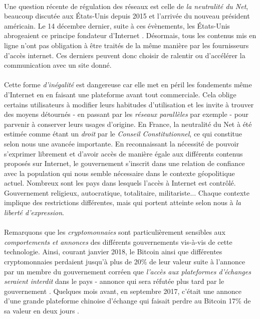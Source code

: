 \paragraph{} Une question récente de régulation des réseaux est celle de \emph{la neutralité du Net},
beaucoup discutée aux États-Unis depuis 2015 et l'arrivée du nouveau président américain. Le 14 décembre
dernier, suite à ces évènements, les États-Unis abrogeaient ce principe fondateur d'Internet \cite{NetNeutrality0}.
Désormais, tous les contenus mis en ligne n'ont pas obligation à être traités de la même manière par
les fournisseurs d'accès internet. Ces derniers peuvent donc choisir de ralentir ou d'accélérer la communication
avec un site donné.

\paragraph{} Cette forme \emph{d'inégalité} est dangereuse car elle met en péril les fondements même d'Internet
en en faisant une plateforme avant tout commerciale. Cela oblige certains utilisateurs à modifier leurs habitudes 
d'utilisation et les invite à trouver des moyens détournés - en passant par les \emph{réseaux parallèles} par exemple -
pour parvenir à conserver leurs usages d'origine. En France, la neutralité du Net à été estimée comme étant un \emph{droit} 
par le \emph{Conseil Constitutionnel}, ce qui constitue selon nous une avancée importante. En reconnaissant la
nécessité de pouvoir s'exprimer librement et d'avoir accès de manière égale aux différents contenus proposés
sur Internet, le gouvernement s'inscrit dans une relation de confiance avec la population qui nous semble
nécessaire dans le contexte géopolitique actuel. Nombreux sont les pays dans lesquels l'accès à Internet
est contrôlé. Gouvernement religieux, autocratique, totalitaire, militariste... Chaque contexte implique
des restrictions différentes, mais qui portent atteinte selon nous à \emph{la liberté d'expression}.

\paragraph{} Remarquons que les \emph{cryptomonnaies} sont particulièrement sensibles aux \emph{comportements
et annonces} des différents gouvernements vis-à-vis de cette technologie. Ainsi, courant janvier 2018, le Bitcoin
ainsi que différentes cryptomonnaies perdaient jusqu'à plus de 20\% de leur valeur suite à l'annonce par un membre du
gouvernement corréen que \emph{l'accès aux plateformes d'échanges seraient interdit} dans le pays
- annonce qui sera réfutée plus tard par le gouvernement \cite{CryptoMonnaies0}. Quelques mois avant, en septembre 2017, 
c'était une annonce d'une grande plateforme chinoise d'échange qui faisait perdre au Bitcoin 17\% de sa valeur en deux 
jours \cite{CryptoMonnaies1}.

